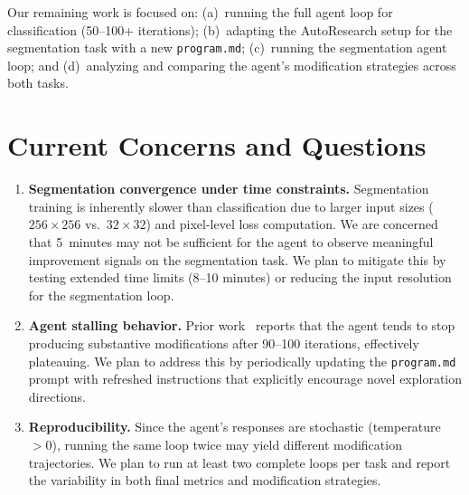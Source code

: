 \documentclass[10pt,twocolumn,letterpaper]{article}
\begin{document}
\noindent Our remaining work is focused on: (a)~running the full agent loop for classification (50--100+ iterations); (b)~adapting the AutoResearch setup for the segmentation task with a new \texttt{program.md}; (c)~running the segmentation agent loop; and (d)~analyzing and comparing the agent's modification strategies across both tasks.

\section{Current Concerns and Questions}

\begin{enumerate}
    \item \textbf{Segmentation convergence under time constraints.} Segmentation training is inherently slower than classification due to larger input sizes ($256\times256$ vs.\ $32\times32$) and pixel-level loss computation. We are concerned that 5~minutes may not be sufficient for the agent to observe meaningful improvement signals on the segmentation task. We plan to mitigate this by testing extended time limits (8--10 minutes) or reducing the input resolution for the segmentation loop.

    \item \textbf{Agent stalling behavior.} Prior work~\cite{Erhard2025AutoResearchCIFAR} reports that the agent tends to stop producing substantive modifications after 90--100 iterations, effectively plateauing. We plan to address this by periodically updating the \texttt{program.md} prompt with refreshed instructions that explicitly encourage novel exploration directions.

    \item \textbf{Reproducibility.} Since the agent's responses are stochastic (temperature $> 0$), running the same loop twice may yield different modification trajectories. We plan to run at least two complete loops per task and report the variability in both final metrics and modification strategies.
\end{enumerate}

{\small


}
\end{document}
